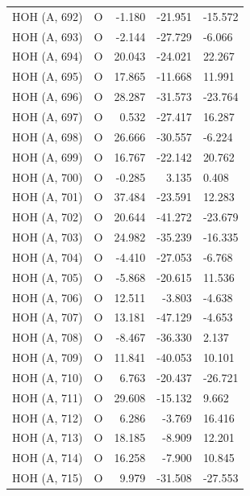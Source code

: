 \begin{longtable}{@{}lcrr@{}}
  \cmidrule(r){1-5}
  HOH (A, 692) & O & -1.180 & -21.951 & -15.572 \\
  \cmidrule(r){1-5}
  HOH (A, 693) & O & -2.144 & -27.729 & -6.066 \\
  \cmidrule(r){1-5}
  HOH (A, 694) & O & 20.043 & -24.021 & 22.267 \\
  \cmidrule(r){1-5}
  HOH (A, 695) & O & 17.865 & -11.668 & 11.991 \\
  \cmidrule(r){1-5}
  HOH (A, 696) & O & 28.287 & -31.573 & -23.764 \\
  \cmidrule(r){1-5}
  HOH (A, 697) & O & 0.532 & -27.417 & 16.287 \\
  \cmidrule(r){1-5}
  HOH (A, 698) & O & 26.666 & -30.557 & -6.224 \\
  \cmidrule(r){1-5}
  HOH (A, 699) & O & 16.767 & -22.142 & 20.762 \\
  \cmidrule(r){1-5}
  HOH (A, 700) & O & -0.285 & 3.135 & 0.408 \\
  \cmidrule(r){1-5}
  HOH (A, 701) & O & 37.484 & -23.591 & 12.283 \\
  \cmidrule(r){1-5}
  HOH (A, 702) & O & 20.644 & -41.272 & -23.679 \\
  \cmidrule(r){1-5}
  HOH (A, 703) & O & 24.982 & -35.239 & -16.335 \\
  \cmidrule(r){1-5}
  HOH (A, 704) & O & -4.410 & -27.053 & -6.768 \\
  \cmidrule(r){1-5}
  HOH (A, 705) & O & -5.868 & -20.615 & 11.536 \\
  \cmidrule(r){1-5}
  HOH (A, 706) & O & 12.511 & -3.803 & -4.638 \\
  \cmidrule(r){1-5}
  HOH (A, 707) & O & 13.181 & -47.129 & -4.653 \\
  \cmidrule(r){1-5}
  HOH (A, 708) & O & -8.467 & -36.330 & 2.137 \\
  \cmidrule(r){1-5}
  HOH (A, 709) & O & 11.841 & -40.053 & 10.101 \\
  \cmidrule(r){1-5}
  HOH (A, 710) & O & 6.763 & -20.437 & -26.721 \\
  \cmidrule(r){1-5}
  HOH (A, 711) & O & 29.608 & -15.132 & 9.662 \\
  \cmidrule(r){1-5}
  HOH (A, 712) & O & 6.286 & -3.769 & 16.416 \\
  \cmidrule(r){1-5}
  HOH (A, 713) & O & 18.185 & -8.909 & 12.201 \\
  \cmidrule(r){1-5}
  HOH (A, 714) & O & 16.258 & -7.900 & 10.845 \\
  \cmidrule(r){1-5}
  HOH (A, 715) & O & 9.979 & -31.508 & -27.553 \\

\end{longtable}
